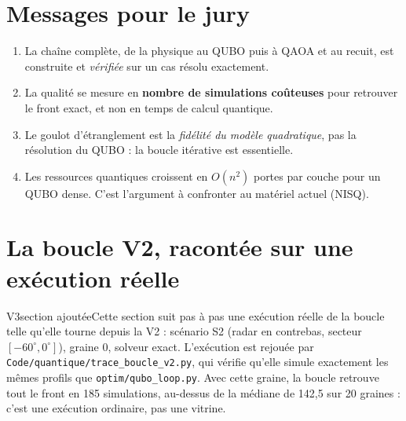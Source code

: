 \section{Messages pour le jury}
\begin{enumerate}
\item La chaîne complète, de la physique au QUBO puis à QAOA et au recuit, est construite et \emph{vérifiée} sur un cas résolu exactement.
\item La qualité se mesure en \textbf{nombre de simulations coûteuses} pour retrouver le front exact, et non en temps de calcul quantique.
\item Le goulot d'étranglement est la \emph{fidélité du modèle quadratique}, pas la résolution du QUBO : la boucle itérative est essentielle.
\item Les ressources quantiques croissent en $O(n^2)$ portes par couche pour un QUBO dense. C'est l'argument à confronter au matériel actuel (NISQ).
\end{enumerate}

\section{La boucle V2, racontée sur une exécution réelle}\label{sec:boucle-v2}
\begin{evolution}{V3}{section ajoutée}Cette section suit pas à pas une exécution réelle de la boucle telle qu'elle tourne depuis la V2 : scénario S2 (radar en contrebas, secteur $[-60^\circ,0^\circ]$), graine 0, solveur exact. L'exécution est rejouée par \texttt{Code/quantique/trace\_boucle\_v2.py}, qui vérifie qu'elle simule exactement les mêmes profils que \texttt{optim/qubo\_loop.py}. Avec cette graine, la boucle retrouve tout le front en 185 simulations, au-dessus de la médiane de 142,5 sur 20 graines : c'est une exécution ordinaire, pas une vitrine.\end{evolution}

